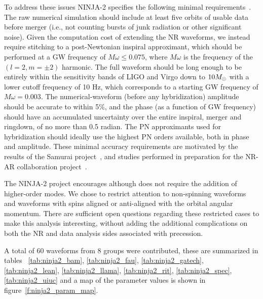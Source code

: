 To address these issues NINJA-2 specifies the following minimal
requirements~\cite{ninja2-wiki}.  The raw numerical simulation should
include at least five orbits of usable data before merger (i.e., not
counting bursts of junk radiation or other significant noise).  Given
the computation cost of extending the NR waveforms, we instead require
stitching to a post-Newtonian inspiral approximant, which should be
performed at a GW frequency of $M\omega \leq 0.075$, where $M\omega$
is the frequency of the $(l = 2, m = \pm 2)$ harmonic. The full
waveform should be long enough to be entirely within the sensitivity
bands of LIGO and Virgo down to $10 M_\odot$ with a lower cutoff
frequency of 10 Hz, which corresponds to a starting GW frequency of
$M\omega = 0.003$.  The numerical-waveform (before any hybridization)
amplitude should be accurate to within 5\%, and the phase (as a
function of GW frequency) should have an accumulated uncertainty over
the entire inspiral, merger and ringdown, of no more than 0.5 radian.
The PN approximants used for hybridization should ideally use the
highest PN orders available, both in phase and amplitude.  These
minimal accuracy requirements are motivated by the results of the
Samurai project~\cite{Hannam:2009hh}, and studies performed in
preparation for the NR-AR collaboration project~\cite{ninja-wiki}.

The NINJA-2 project encourages although does not require the addition
of higher-order modes.  We chose to restrict attention to non-spinning
waveforms and waveforms with spins aligned or anti-aligned with the
orbital angular momentum.  There are sufficient open questions
regarding these restricted cases to make this analysis interesting,
without adding the additional complications on both the NR and data
analysis sides associated with precession. 

A total of 60 waveforms from 8 groups were contributed, these are
summarized in tables ~\ref{tab:ninja2_bam}, \ref{tab:ninja2_fau},
\ref{tab:ninja2_gatech}, \ref{tab:ninja2_lean},
\ref{tab:ninja2_llama}, \ref{tab:ninja2_rit}, \ref{tab:ninja2_spec},
\ref{tab:ninja2_uiuc} and a map of the parameter values is shown in
figure~\ref{f:ninja2_param_map}.

